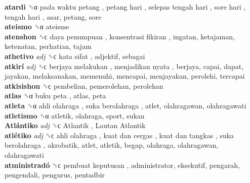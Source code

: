 \textbf{atardi} ␝α   pada waktu petang ,  petang hari ,  selepas tengah hari ,  sore hari ,  tengah hari , asar, petang, sore  \\
\textbf{ateismo} ␝α  ateisme  \\
\textbf{atenshon} ␝ϲ   daya penumpuan ,  konsentrasi fikiran , ingatan, ketajaman, ketenatan, perhatian, tajam  \\
\textbf{athetivo} \emph{adj}  ␝ϲ   kata sifat , adjektif, sebagai  \\
\textbf{atkirí} \emph{adj}  ␝ϲ   berjaya melakukan ,  menjadikan nyata , berjaya, capai, dapat, jayakan, melaksanakan, memenuhi, mencapai, menjayakan, perolehi, tercapai  \\
\textbf{atkisishon} ␝ϲ  pembelian, pemerolehan, perolehan  \\
\textbf{atlas} ␝α   buku peta , atlas, peta  \\
\textbf{atleta} ␝α   ahli olahraga ,  suka berolahraga , atlet, olahragawan, olahragawati  \\
\textbf{atletismo} ␝α  atletik, olahraga, sport, sukan  \\
\textbf{Atlántiko} \emph{adj}  ␝ϲ   Atlantik ,  Lautan Atlantik   \\
\textbf{atlétiko} \emph{adj}  ␝ϲ   ahli olahraga ,  kuat dan cergas ,  kuat dan tangkas ,  suka berolahraga , akrobatik, atlet, atletik, begap, olahraga, olahragawan, olahragawati  \\
\textbf{atministradó} ␝ϲ   pembuat keputusan , administrator, eksekutif, pengarah, pengendali, pengurus, pentadbir  \\
